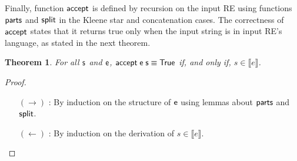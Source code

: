 \documentclass[oneside,12pt]{scrbook}
\newtheorem{Theorem}{Theorem}
\theoremstyle{definition}
\newcommand{\C}[1]{\red{\mathsf{#1}}}
\newcommand{\F}[1]{\green{\mathsf{#1}}}
\newcommand{\V}[1]{\black{\mathsf{#1}}}
\newcommand{\sembrackets}[1]{\ensuremath{\llbracket #1 \rrbracket}}
\theoremstyle{plain}
\theoremstyle{definition}
\begin{document}
Finally, function \ensuremath{\F{accept}} is defined by recursion on the input RE using functions \ensuremath{\F{parts}} and \ensuremath{\F{split}} in the
Kleene star and concatenation cases. The correctness of \ensuremath{\F{accept}} states that it returns true only when the
input string is in input RE's language, as stated in the next theorem.
\begin{Theorem}
	For all \ensuremath{\V{s}} and \ensuremath{\V{e}}, \ensuremath{\F{accept}\;\V{e}\;\V{s}\equiv \C{True}} if, and only if, $s\in\sembrackets{e}$.
\end{Theorem}
\begin{proof}
	$\,$\\
	\begin{itemize}
		\item[$(\to)$]: By induction on the structure of \ensuremath{\V{e}} using lemmas about \ensuremath{\F{parts}} and \ensuremath{\F{split}}.
		\item[$(\leftarrow)$]: By induction on the derivation of $s \in\sembrackets{e}$.
	\end{itemize}
\end{proof}
\end{document}
